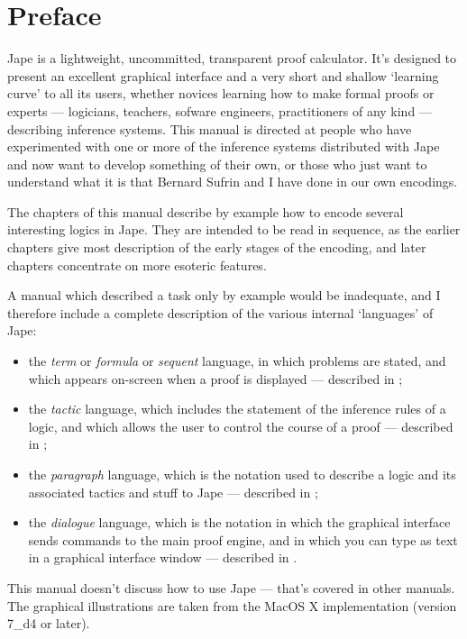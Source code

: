 \chapter*{Preface}

Jape is a lightweight, uncommitted, transparent proof calculator. It's designed to present an excellent graphical interface and a very short and shallow `learning curve' to all its users, whether novices learning how to make formal proofs or experts --- logicians, teachers, sofware engineers, practitioners of any kind --- describing inference systems. This manual is directed at people who have experimented with one or more of the inference systems distributed with Jape and now want to develop something of their own, or those who just want to understand what it is that Bernard Sufrin and I have done in our own encodings.


The chapters of this manual describe by example how to encode several interesting logics in Jape. They are intended to be read in sequence, as the earlier chapters give most description of the early stages of the encoding, and later chapters concentrate on more esoteric features.


A manual which described a task only by example would be inadequate, and I therefore include a complete description of the various internal `languages' of Jape:

\begin{itemize}
\item the \emph{term} or \emph{formula} or \emph{sequent} language, in which problems are stated, and which appears on-screen when a proof is displayed --- described in ;
\item the \emph{tactic} language, which includes the statement of the inference rules of a logic, and which allows the user to control the course of a proof --- described in ;
\item the \emph{paragraph} language, which is the notation used to describe a logic and its associated tactics and stuff to Jape --- described in ;
\item the \emph{dialogue} language, which is the notation in which the graphical interface sends commands to the main proof engine, and in which you can type as text in a graphical interface window --- described in .
\end{itemize}

This manual doesn't discuss how to use Jape --- that's covered in other manuals. The graphical illustrations are taken from the MacOS X implementation (version 7\_d4 or later).

